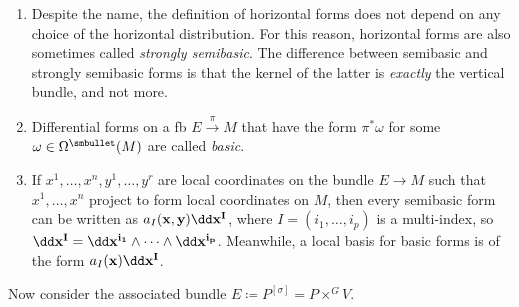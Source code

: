 \begin{rem}
    \begin{enumerate}
        \item Despite the name, the definition of horizontal forms does not depend on any choice of the horizontal distribution. For this reason, horizontal forms are also sometimes called \emph{strongly semibasic}. The difference between semibasic and strongly semibasic forms is that the kernel of the latter is \emph{exactly} the vertical bundle, and not more.
        \item Differential forms on a \gls{fb} $E\overset{\pi}{\to} M$ that have the form $\pi^\ast\omega $ for some $\omega\in \Omega^{\smbullet}(M)$ are called \emph{basic}.
        \item If $x^1,\ldots,x^n,y^1,\ldots,y^r$ are local coordinates on the bundle $E\to M$ such that $x^1,\ldots,x^n$ project to form local coordinates on $M$, then every semibasic form can be written as $a_I(\bf{x},\bf{y})\dd \bf{x}^I$, where $I=(i_1,\ldots,i_p)$ is a multi-index, so $\dd \bf{x}^I=\dd x^{i_1}\wedge\cdots\wedge\dd x^{i_p}$. Meanwhile, a local basis for basic forms is of the form $a_I(\bf{x})\dd \bf{x}^I$.
    \end{enumerate}
\end{rem}

Now consider the associated bundle $E\coloneqq P^{[\sigma]}=P\times^G V$.


